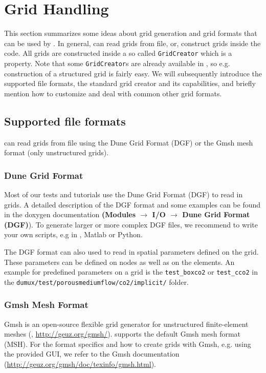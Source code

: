 \section{Grid Handling}
\label{sec:gridhandling}

This section summarizes some ideas about grid generation and grid formats that can be used by \Dumux. In general,
\Dumux can read grids from file, or, construct grids inside the code. All grids are constructed inside a so called \texttt{GridCreator} which is a \Dumux property.
Note that some \texttt{GridCreator}s are already available in \Dumux, so e.g.
construction of a structured grid is fairly easy. We will subsequently introduce the supported file formats, the standard grid creator and its capabilities,
and briefly mention how to customize and deal with common other grid formats.

\subsection{Supported file formats}
\Dumux can read grids from file using the Dune Grid Format (DGF) or the Gmsh mesh format (only unstructured grids).

\subsubsection{Dune Grid Format}
Most of our \Dumux tests and tutorials use the Dune Grid Format (DGF) to read in grids. A detailed description
of the DGF format and some examples can be found in the \Dune doxygen documentation
\textbf{(Modules $\rightarrow$ I/O $\rightarrow$ Dune Grid Format (DGF)}). To generate larger or more
complex DGF files, we recommend to write your own scripts, e.g in \Cplusplus, Matlab or Python.

The DGF format can also used to read in spatial parameters defined on the grid. These parameters can
be defined on nodes as well as on the elements. An example for predefined parameters on a grid is
the \texttt{test\_boxco2} or \texttt{test\_cco2} in the  \texttt{dumux/test/porousmediumflow/co2/implicit/} folder.

\subsubsection{Gmsh Mesh Format}
Gmsh is an open-source flexible grid generator for unstructured finite-element meshes (\cite{GEUZAINE2009}, \url{http://geuz.org/gmsh/}).
\Dumux supports the default Gmsh mesh format (MSH). For the format specifics and how to create grids with Gmsh, e.g. using
the provided GUI, we refer to the Gmsh documentation (\url{http://geuz.org/gmsh/doc/texinfo/gmsh.html}).

